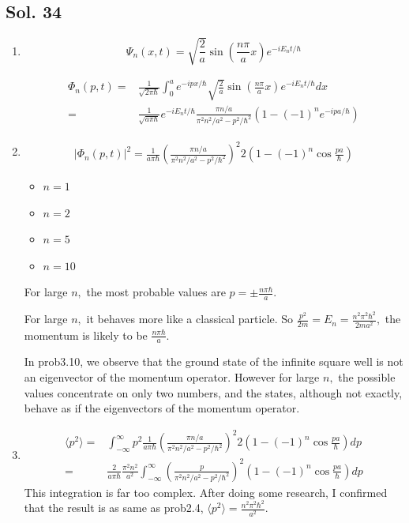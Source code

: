 \subsection*{Sol. 34}
\begin{enumerate}
    \item $$
    \Psi_n(x,t) = \sqrt{\frac{2}{a}}\sin\left(\frac{n\pi}{a}x\right)
    e^{-iE_n t/\hbar}
    $$

    \begin{align*}
        \Phi_n(p,t)
        =&\frac{1}{\sqrt{2\pi\hbar}}
        \int_0^a 
        e^{-ipx/\hbar}
        \sqrt{\frac{2}{a}}\sin\left(\frac{n\pi}{a}x\right)
    e^{-iE_n t/\hbar}dx\\
    =&\frac{1}{\sqrt{a\pi\hbar}}
    e^{-iE_n t/\hbar}
    \frac{\pi n /a}{\pi^2n^2/a^2-p^2/\hbar^2}(1-(-1)^ne^{-ipa/\hbar})
    \end{align*}
    \item 
    \begin{align*}
        |\Phi_n(p,t)|^2
        =
        \frac{1}{a\pi\hbar}
        \left(\frac{\pi n/a}{\pi^2n^2/a^2-p^2/\hbar^2}\right)^2
        2\left(1-(-1)^n\cos\frac{pa}{\hbar}\right)
    \end{align*}
    \begin{itemize}
        \item $n=1$
        \item $n=2$
    \item $n=5$ 
    \item $n=10$
    \end{itemize}
    
    For large $n,$ the most probable values are $p=\pm\frac{n\pi\hbar}{a}.$

    For large $n,$ it behaves more like a classical particle. So $\frac{p^2}{2m}=E_n=\frac{n^2\pi^2\hbar^2}{2ma^2},$ the momentum is likely to be $\frac{n\pi\hbar}{a}.$ 

    In prob3.10, we observe that the ground state of the infinite square well is not an eigenvector of the momentum operator. However for large $n,$ the possible values concentrate on only two numbers, and the states, although not exactly, behave as if the eigenvectors of the momentum operator.

    \item 
    \begin{align*}
        \langle p^2\rangle=&
        \int_{-\infty}^{\infty} p^2\frac{1}{a\pi\hbar}
        \left(\frac{\pi n/a}{\pi^2n^2/a^2-p^2/\hbar^2}\right)^2
        2\left(1-(-1)^n\cos\frac{pa}{\hbar}\right) dp\\
        =&
        \frac{2}{a\pi\hbar}
        \frac{\pi^2n^2}{a^2}
        \int_{-\infty}^{\infty}
        \left(
        \frac{p}{\pi^2n^2/a^2-p^2/\hbar^2}
        \right)^2
        (1-(-1)^n\cos\frac{pa}{\hbar})dp
    \end{align*}
    This integration is far too complex. After doing some research, I confirmed that the result is as same as prob2.4, $\langle p^2\rangle=\frac{n^2\pi^2\hbar^2}{a^2}.$
    
\end{enumerate}

